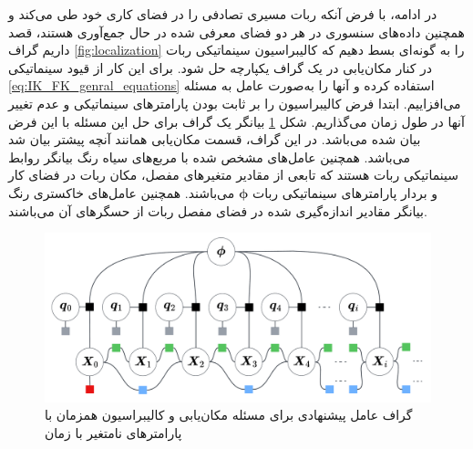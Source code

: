 در ادامه، با فرض آنکه ربات مسیری تصادفی را در فضای کاری خود طی می‌کند و همچنین داده‌های سنسوری در هر دو فضای معرفی شده در حال جمع‌آوری هستند، قصد داریم گراف
\ref{fig:localization}
را به گونه‌ای بسط دهیم که کالیبراسیون سینماتیکی ربات در کنار مکان‌یابی در یک گراف یکپارچه حل شود. برای این کار از قیود سینماتیکی
\ref{eq:IK_FK_genral_equations}
استفاده کرده و آنها را به‌صورت عامل به مسئله می‌افزاییم. ابتدا فرض کالیبراسیون را بر ثابت بودن پارامترهای سینماتیکی و عدم تغییر آنها در طول زمان می‌گذاریم. شکل
\ref{fig:kinematiclocalizationbasic}
بیانگر یک گراف برای حل این مسئله با این فرض بیان شده می‌باشد. در این گراف، قسمت مکان‌یابی همانند آنچه پیشتر بیان شد می‌باشد. همچنین عامل‌های مشخص شده با مربع‌های سیاه رنگ بیانگر روابط سینماتیکی ربات هستند که تابعی از مقادیر متغیرهای مفصل، مکان ربات در فضای کار و بردار پارامترهای سینماتیکی ربات
 $\boldsymbol{\phi}$
 می‌باشند. همچنین عامل‌های خاکستری رنگ بیانگر مقادیر اندازه‌گیری شده در فضای مفصل ربات از حسگرهای آن می‌باشند. 
\begin{figure}
	\centering
	\includegraphics[width=0.8\linewidth]{img/Kinematic_localization_basic}
	\caption{گراف عامل پیشنهادی برای مسئله مکان‌یابی و کالیبراسیون همزمان با پارامتر‌های نامتغیر با زمان}
	\label{fig:kinematiclocalizationbasic}
\end{figure}

